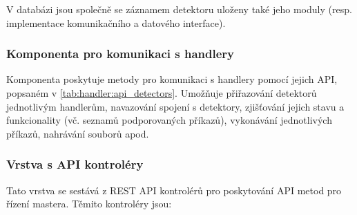 V databázi jsou společně se záznamem detektoru uloženy také jeho moduly (resp. implementace komunikačního a datového interface).

\subsubsection{Komponenta pro komunikaci s handlery}
Komponenta poskytuje metody pro komunikaci s handlery pomocí jejich API, popsaném v \ref{tab:handler:api_detectors}. Umožňuje přiřazování detektorů jednotlivým handlerům, navazování spojení s detektory, zjišťování jejich stavu a funkcionality (vč. seznamů podporovaných příkazů), vykonávání jednotlivých příkazů, nahrávání souborů apod.

\subsubsection{Vrstva s API kontroléry}\label{chap:master:backend:sw_arch:api}
Tato vrstva se sestává z REST API kontrolérů pro poskytování API metod pro řízení mastera. Těmito kontroléry jsou:
